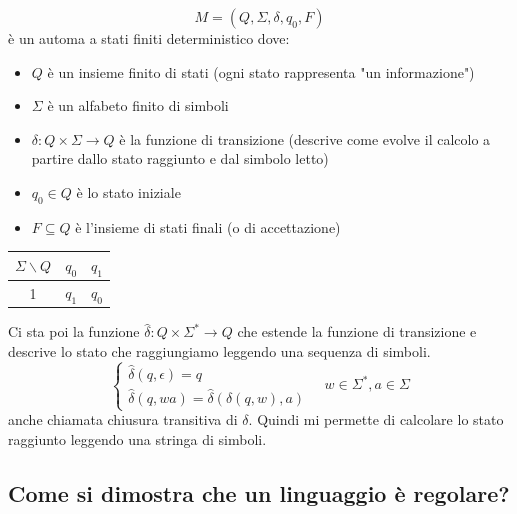 \documentclass[a4paper]{article}
\begin{document}
{
    \[M = (Q, \Sigma, \delta, q_0, F)\]
    è un automa a stati finiti deterministico dove:
    \begin{itemize}
        \item $Q$ è un insieme finito di stati (ogni stato rappresenta "un informazione")
        \item $\Sigma$ è un alfabeto finito di simboli
        \item $\delta : Q \times \Sigma \rightarrow Q$ è la funzione di transizione (descrive come evolve il
        calcolo a partire dallo stato raggiunto e dal simbolo letto)
        \item $q_0 \in Q$ è lo stato iniziale
        \item $F \subseteq Q$ è l'insieme di stati finali (o di accettazione)
    \end{itemize}
}
\begin{table}[H]
    \centering
    \begin{tabular}{|c|c|c|}
        \hline
        $\Sigma \backslash Q$ & $q_0$ & $q_1$\\
        \hline
        1 & $q_1$ & $q_0$ \\
        \hline
    \end{tabular}
\end{table}
\noindent
Ci sta poi la funzione $\hat{\delta} : Q \times \Sigma^* \rightarrow Q$ che estende la funzione di transizione e descrive
lo stato che raggiungiamo leggendo una sequenza di simboli.
\[
\begin{cases}
    \hat{\delta}(q, \epsilon) = q\\
    \hat{\delta}(q, w a) = \hat{\delta}(\delta(q,w), a)
\end{cases}
\quad w \in \Sigma^*, a \in \Sigma
\]
anche chiamata chiusura transitiva di $\delta$. Quindi mi permette
di calcolare lo stato raggiunto leggendo una stringa di simboli.

\subsection{Come si dimostra che un linguaggio è regolare?}
\end{document}
